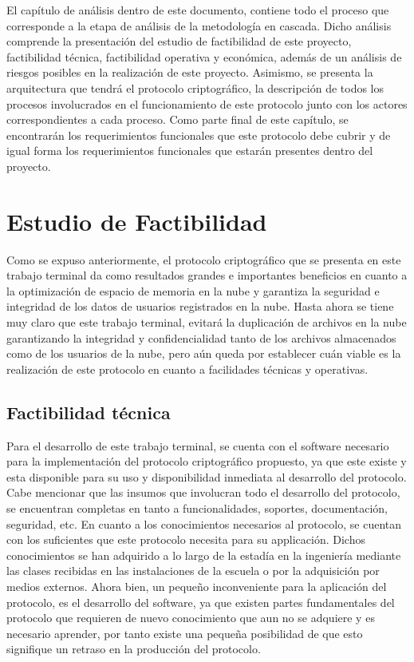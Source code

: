 
El capítulo de análisis dentro de este documento, contiene todo el proceso que corresponde a la etapa de análisis de la metodología en cascada. Dicho análisis comprende la presentación del estudio de factibilidad de este proyecto, factibilidad técnica, factibilidad operativa y económica, además de un análisis de riesgos posibles en la realización de este proyecto. Asimismo, se presenta la arquitectura que tendrá el protocolo criptográfico, la descripción de todos los procesos involucrados en el funcionamiento de este protocolo junto con los actores correspondientes a cada proceso. Como parte final de este capítulo, se encontrarán los requerimientos funcionales que este protocolo debe cubrir y de igual forma los requerimientos funcionales que estarán presentes dentro del proyecto. 






\section{Estudio de Factibilidad}

Como se expuso anteriormente, el protocolo criptográfico que se presenta en este trabajo terminal da como resultados grandes e importantes beneficios en cuanto a la optimización de espacio de memoria en la nube y garantiza la seguridad e integridad de los datos de usuarios registrados en la nube. Hasta ahora se tiene muy claro que este trabajo terminal, evitará la duplicación de archivos en la nube garantizando la integridad y confidencialidad tanto de los archivos almacenados como de los usuarios de la nube, pero aún queda por establecer cuán viable es la realización de este protocolo en cuanto a facilidades técnicas y operativas.


\subsection{Factibilidad técnica}

Para el desarrollo de este trabajo terminal, se cuenta con el software necesario para la implementación del protocolo criptográfico propuesto,  ya que este existe y esta disponible para su uso y disponibilidad inmediata al desarrollo del protocolo. Cabe mencionar que las insumos que involucran todo el desarrollo del protocolo, se encuentran completas en tanto a funcionalidades, soportes, documentación, seguridad, etc. 
En cuanto a los conocimientos necesarios al protocolo, se cuentan con los suficientes que este protocolo necesita para su applicación. Dichos conocimientos se han adquirido a lo largo de la estadía en la ingeniería mediante las clases recibidas en las instalaciones de la  escuela o por la adquisición por medios externos. Ahora bien, un pequeño inconveniente para la aplicación del protocolo, es el desarrollo del software, ya que existen partes fundamentales del protocolo que requieren de nuevo conocimiento que aun no se adquiere y es necesario aprender, por tanto existe una pequeña posibilidad de que esto signifique un retraso en la producción del protocolo. 

